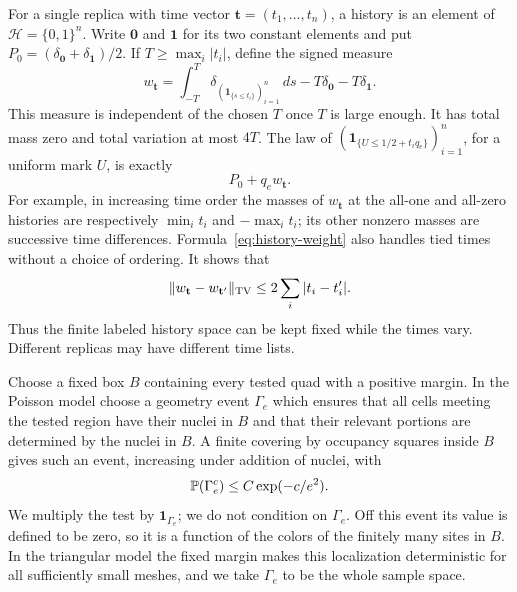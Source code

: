For a single replica with time vector
$\mathbf t=(t_1,\ldots,t_n)$, a history is an element of
$\mathcal H=\{0,1\}^n$.  Write $\mathbf0$ and $\mathbf1$ for its
two constant elements and put
$P_0=(\delta_{\mathbf0}+\delta_{\mathbf1})/2$.
If $T\geq\max_i|t_i|$, define the signed measure
\begin{equation}
 w_{\mathbf t}
 =\int_{-T}^{T}\delta_{(\mathbf1_{\{s\leq t_i\}})_{i=1}^n}\,ds
       -T\delta_{\mathbf0}-T\delta_{\mathbf1}.
 \label{eq:history-weight}
\end{equation}
This measure is independent of the chosen $T$ once $T$ is large enough.
It has total mass zero and total variation at most $4T$.  The law of
$(\mathbf1_{\{U\leq1/2+t_iq_e\}})_{i=1}^n$, for a uniform mark $U$,
is exactly
\begin{equation}
                         P_0+q_ew_{\mathbf t}.
 \label{eq:exact-history-law}
\end{equation}
For example, in increasing time order the masses of
$w_{\mathbf t}$ at the all-one and all-zero histories are respectively
$\min_i t_i$ and $-\max_i t_i$; its other nonzero masses are successive
time differences.  Formula~\eqref{eq:history-weight} also handles tied
times without a choice of ordering.  It shows that
\begin{equation}
 \|w_{\mathbf t}-w_{\mathbf t'}\|_{\operatorname{TV}}
       \leq2\sum_i|t_i-t_i'|.
 \label{eq:history-continuity}
\end{equation}
Thus the finite labeled history space can be kept fixed while the times
vary.  Different replicas may have different time lists.

Choose a fixed box $B$ containing every tested quad with a positive
margin.  In the Poisson model choose a geometry event $\Gamma_e$ which
ensures that all cells meeting the tested region have their nuclei in
$B$ and that their relevant portions are determined by the nuclei in
$B$.  A finite covering by occupancy squares inside $B$ gives such an
event, increasing under addition of nuclei, with
\begin{equation}
                  \mathbb P(\Gamma_e^c)\leq C\exp(-c/e^2).
 \label{eq:expansion-cutoff}
\end{equation}
We multiply the test by $\mathbf1_{\Gamma_e}$; we do not condition on
$\Gamma_e$.  Off this event its value is defined to be zero, so it is
a function of the colors of the finitely many sites in $B$.  In the
triangular model the fixed margin makes this localization deterministic
for all sufficiently small meshes, and we take $\Gamma_e$ to be the
whole sample space.

